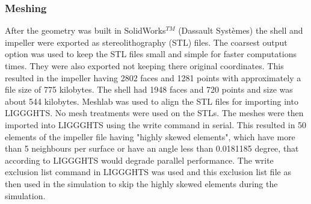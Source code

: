 \documentclass[preprint,11pt,authoryear]{elsarticle}
\begin{document}
\subsubsection{Meshing}
 After the geometry was built in SolidWorks$^{TM}$ (Dassault Syst\`{e}mes) the shell and impeller 
were exported as stereolithography (STL) files. The coarsest output option was used to keep the STL files small and 
simple for faster computations times. They were also exported not keeping there original coordinates.  
This resulted in the impeller having 2802 faces and 1281 points with approximately a file size of 775 
kilobytes. The shell had 1948 faces and 720 points and size was about 544 kilobytes.  
 Meshlab was used to align the STL files for importing into LIGGGHTS. No mesh treatments were 
used on the STLs. 
 The meshes were then imported into LIGGGHTS using the write command in serial. This resulted 
in 50 elements of the impeller file having "highly skewed elements", which have more than 5 
neighbours per surface or have an angle less than 0.0181185 degree, that according to LIGGGHTS 
would degrade parallel performance. The write exclusion list command in LIGGGHTS was used and 
this exclusion list file as then used in the simulation to skip the highly skewed elements during the 
simulation. 
\end{document}
